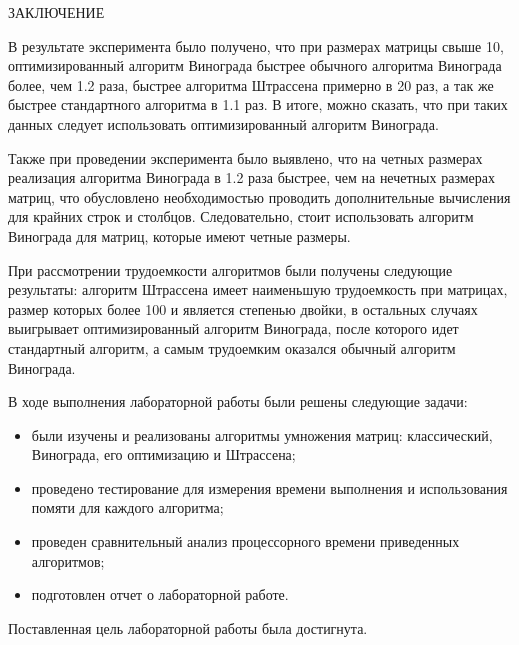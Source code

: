 \begin{center}
	ЗАКЛЮЧЕНИЕ
\end{center}

В результате эксперимента было получено, что при размерах матрицы свыше 10, оптимизированный алгоритм Винограда быстрее обычного алгоритма Винограда более, чем 1.2 раза, быстрее алгоритма Штрассена примерно в 20 раз, а так же быстрее стандартного алгоритма в 1.1 раз. В итоге, можно сказать, что при таких данных следует использовать оптимизированный алгоритм Винограда.

Также при проведении эксперимента было выявлено, что на четных размерах реализация алгоритма Винограда в 1.2 раза быстрее, чем на нечетных размерах матриц, что обусловлено необходимостью проводить дополнительные вычисления для крайних строк и столбцов.  Следовательно, стоит использовать алгоритм Винограда для матриц, которые имеют четные размеры.

При рассмотрении трудоемкости алгоритмов были получены следующие результаты: алгоритм Штрассена имеет наименьшую трудоемкость при матрицах, размер которых более 100 и является степенью двойки, в остальных случаях выигрывает оптимизированный алгоритм Винограда, после которого идет стандартный алгоритм, а самым трудоемким оказался обычный алгоритм Винограда.

В ходе выполнения лабораторной работы были решены следующие задачи:
\begin{itemize}
	\item были изучены и реализованы алгоритмы умножения матриц:  классический, Винограда, его оптимизацию и Штрассена;
    \item проведено тестирование для измерения времени выполнения и использования помяти для каждого алгоритма;
    \item проведен сравнительный анализ процессорного времени приведенных алгоритмов;
	\item подготовлен отчет о лабораторной работе.
\end{itemize}

Поставленная цель лабораторной работы была достигнута.